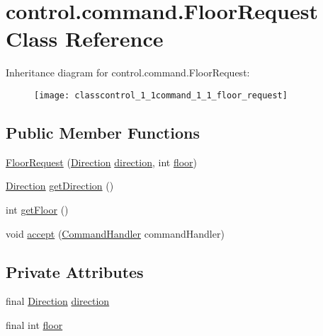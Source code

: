 \hypertarget{classcontrol_1_1command_1_1_floor_request}{}\section{control.\+command.\+Floor\+Request Class Reference}
\label{classcontrol_1_1command_1_1_floor_request}
Inheritance diagram for control.\+command.\+Floor\+Request\+:\begin{figure}[H]
\begin{center}
\leavevmode
\texttt{[image: classcontrol\_1\_1command\_1\_1\_floor\_request]}
\end{center}
\end{figure}
\subsection*{Public Member Functions}
\begin{DoxyCompactItemize}
\item 
\mbox{\hyperlink{classcontrol_1_1command_1_1_floor_request_a03685a59d9f54c5057713039fa580369}{Floor\+Request}} (\mbox{\hyperlink{enumcontrol_1_1command_1_1_direction}{Direction}} \mbox{\hyperlink{classcontrol_1_1command_1_1_floor_request_a0d1e1a3a816acba02789469f4e46a5d1}{direction}}, int \mbox{\hyperlink{classcontrol_1_1command_1_1_floor_request_a8cac00f900db9272c0e6971e0327075f}{floor}})
\item 
\mbox{\hyperlink{enumcontrol_1_1command_1_1_direction}{Direction}} \mbox{\hyperlink{classcontrol_1_1command_1_1_floor_request_ad0e7950407e9e15e4a3be8927f1e3408}{get\+Direction}} ()
\item 
int \mbox{\hyperlink{classcontrol_1_1command_1_1_floor_request_a752d0cf165ba8d1033b9d8ca6b4c4d3e}{get\+Floor}} ()
\item 
void \mbox{\hyperlink{classcontrol_1_1command_1_1_floor_request_a89db76c1649b41ee844fb79898ce4de2}{accept}} (\mbox{\hyperlink{interfacecontrol_1_1_command_handler}{Command\+Handler}} command\+Handler)
\end{DoxyCompactItemize}
\subsection*{Private Attributes}
\begin{DoxyCompactItemize}
\item 
final \mbox{\hyperlink{enumcontrol_1_1command_1_1_direction}{Direction}} \mbox{\hyperlink{classcontrol_1_1command_1_1_floor_request_a0d1e1a3a816acba02789469f4e46a5d1}{direction}}
\item 
final int \mbox{\hyperlink{classcontrol_1_1command_1_1_floor_request_a8cac00f900db9272c0e6971e0327075f}{floor}}
\end{DoxyCompactItemize}


